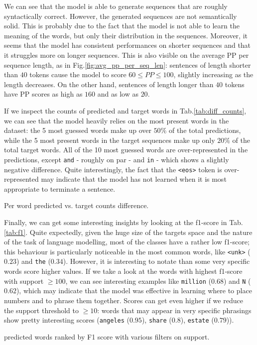 We can see that the model is able to generate sequences that are roughly syntactically correct. However, the generated sequences are not semantically solid. This is probably due to the fact that the model is not able to learn the meaning of the words, but only their distribution in the sequences. Moreover, it seems that the model has consistent performances on shorter sequences and that it struggles more on longer sequences. This is also visible on the average PP per sequence length, as in Fig.\ref{fig:avg_pp_per_seq_len}: sentences of length shorter than $40$ tokens cause the model to score $60 \le PP \le 100$, slightly increasing as the length decreases. On the other hand, sentences of length longer than $40$ tokens have PP scores as high as $160$ and as low as $20$.

If we inspect the counts of predicted and target words in Tab.\ref{tab:diff_counts}, we can see that the model heavily relies on the most present words in the dataset: the 5 most guessed words make up over $50\%$ of the total predictions, while the 5 most present words in the target sequences make up only $20\%$ of the total target words. All of the 10 most guessed words are over-represented in the predictions, except \texttt{and} - roughly on par - and \texttt{in} - which shows a slightly negative difference. Quite interestingly, the fact that the \texttt{<eos>} token is over-represented may indicate that the model has not learned when it is most appropriate to terminate a sentence. 

\begin{table}[hbt]
    \centering
    
    \caption{Per word predicted vs. target counts difference.}
    \label{tab:diff_counts}
\end{table}

Finally, we can get some interesting insights by looking at the f1-score in Tab.\ref{tab:f1}. Quite expectedly, given the huge size of the targets space and the nature of the task of language modelling, most of the classes have a rather low f1-score; this behaviour is particularly noticeable in the most common words, like \texttt{<unk>} ($0.23$) and \texttt{the} ($0.34$). However, it is interesting to notate than some very specific words score higher values. If we take a look at the words with highest f1-score with support $\ge 100$, we can see interesting examples like \texttt{million} ($0.68$) and \texttt{N} ($0.62$), which may indicate that the model was effective in learning where to place numbers and to phrase them together. Scores can get even higher if we reduce the support threshold to $\ge 10$: words that may appear in very specific phrasings show pretty interesting scores (\texttt{angeles} ($0.95$), \texttt{share} ($0.8$), \texttt{estate} ($0.79$)).

\begin{table}[hbt]
    \centering
    
    \caption{predicted words ranked by F1 score with various filters on support.}
    \label{tab:f1}
\end{table}
